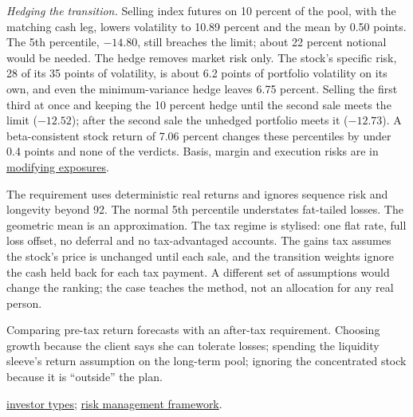 \begin{qfexample}
\emph{Hedging the transition.} Selling index futures on 10 percent of the pool, with the matching cash leg, lowers volatility to 10.89 percent and the mean by 0.50 points. The 5th percentile, $-14.80$, still breaches the limit; about 22 percent notional would be needed. The hedge removes market risk only. The stock's specific risk, 28 of its 35 points of volatility, is about 6.2 points of portfolio volatility on its own, and even the minimum-variance hedge leaves 6.75 percent. Selling the first third at once and keeping the 10 percent hedge until the second sale meets the limit ($-12.52$); after the second sale the unhedged portfolio meets it ($-12.73$). A beta-consistent stock return of 7.06 percent changes these percentiles by under 0.4 points and none of the verdicts. Basis, margin and execution risks are in \hyperref[meth:risk-identification-modification]{modifying exposures}.

 The requirement uses deterministic real returns and ignores sequence risk and longevity beyond 92. The normal 5th percentile understates fat-tailed losses. The geometric mean is an approximation. The tax regime is stylised: one flat rate, full loss offset, no deferral and no tax-advantaged accounts. The gains tax assumes the stock's price is unchanged until each sale, and the transition weights ignore the cash held back for each tax payment. A different set of assumptions would change the ranking; the case teaches the method, not an allocation for any real person.

 Comparing pre-tax return forecasts with an after-tax requirement. Choosing growth because the client says she can tolerate losses; spending the liquidity sleeve's return assumption on the long-term pool; ignoring the concentrated stock because it is ``outside'' the plan.

 \hyperref[def:investor-types-needs]{investor types}; \hyperref[def:risk-management-framework]{risk management framework}.

\end{qfexample}
